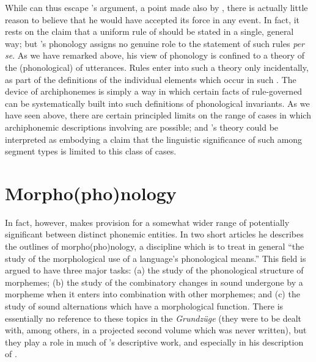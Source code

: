 While {\Trubetzkoy} can thus escape {\Halle}'s argument, a point made also
by \citet{johns69:phonemics}, there is actually little reason to
believe that he would have accepted its force in any event. In fact,
it rests on the claim that a uniform rule of  should be
stated in a single, general way; but {\Trubetzkoy}'s phonology assigns no
genuine role to the statement of such {rules} \emph{per se}. As we have
remarked above, his view of phonology is confined to a theory of the
(phonological)  of utterances. Rules enter into such a
theory only incidentally, as part of the definitions of the individual
elements which occur in such . The device of
archiphonemes is simply a way in which certain facts of rule-governed
 can be systematically built into such definitions of
phonological invariants. As we have seen above, there are certain
principled limits on the range of cases in which archiphonemic
descriptions involving  are possible; and {\Trubetzkoy}'s
theory could be interpreted as embodying a claim that the linguistic
significance of such  among segment types is limited to this
class of cases.

\section{Morpho(pho)nology}

In fact, however, {\Trubetzkoy} makes provision for a somewhat wider
range of potentially significant  between distinct phonemic
entities. In two short articles
\citep{trubetzkoy29:morphophonology,trubetzkoy31:morphophonology} he
describes the outlines of morpho(pho)nology, a discipline which is to
treat in general ``the study of the morphological use of a language's
phonological means.'' This field is argued to have three major tasks:
(a) the study of the phonological structure of morphemes; (b) the
study of the combinatory changes in sound undergone by a morpheme when
it enters into combination with other morphemes; and (c) the study of
sound alternations which have a morphological function. There is
essentially no reference to these topics in the \textsl{Grundzüge}
(they were to be dealt with, among others, in a projected second
volume which was never written), but they play a role in much of
{\Trubetzkoy}'s descriptive work, and especially in his description of
  \citep{trubetzkoy34:russian.morphophonemics}.

